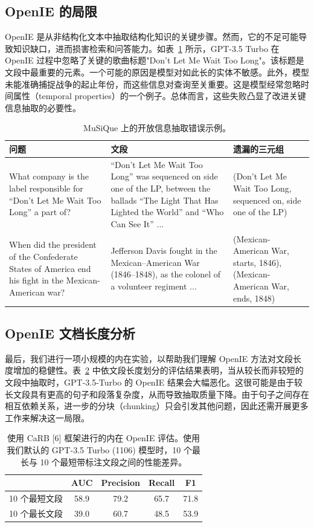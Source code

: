 \documentclass[11pt,UTF8,fontset=fandol]{ctexart}
\begin{document}
\subsection{OpenIE 的局限}

OpenIE 是从非结构化文本中抽取结构化知识的关键步骤。然而，它的不足可能导致知识缺口，进而损害检索和问答能力。如表~\ref{tab:15} 所示，GPT-3.5 Turbo 在 OpenIE 过程中忽略了关键的歌曲标题"Don't Let Me Wait Too Long"。该标题是文段中最重要的元素。一个可能的原因是模型对如此长的实体不敏感。此外，模型未能准确捕捉战争的起止年份，而这些信息对查询至关重要。这是模型经常忽略时间属性（temporal properties）的一个例子。总体而言，这些失败凸显了改进关键信息抽取的必要性。

\begin{table}[H]\centering
\caption{MuSiQue 上的开放信息抽取错误示例。}
\label{tab:15}
\footnotesize
\begin{tabular}{p{3.6cm}p{6.0cm}p{4.2cm}}
\toprule
问题 & 文段 & 遗漏的三元组 \\
\midrule
What company is the label responsible for ``Don't Let Me Wait Too Long'' a part of? &
``Don't Let Me Wait Too Long'' was sequenced on side one of the LP, between the ballads ``The Light That Has Lighted the World'' and ``Who Can See It'' ... &
(Don't Let Me Wait Too Long, sequenced on, side one of the LP) \\
\midrule
When did the president of the Confederate States of America end his fight in the Mexican-American war? &
Jefferson Davis fought in the Mexican--American War (1846--1848), as the colonel of a volunteer regiment ... &
(Mexican-American War, starts, 1846), (Mexican-American War, ends, 1848) \\
\bottomrule
\end{tabular}
\end{table}

\subsection{OpenIE 文档长度分析}

最后，我们进行一项小规模的内在实验，以帮助我们理解 OpenIE 方法对文段长度增加的稳健性。表~\ref{tab:16} 中依文段长度划分的评估结果表明，当从较长而非较短的文段中抽取时，GPT-3.5-Turbo 的 OpenIE 结果会大幅恶化。这很可能是由于较长文段具有更高的句子和段落复杂度，从而导致抽取质量下降。由于句子之间存在相互依赖关系，进一步的分块（chunking）只会引发其他问题，因此还需开展更多工作来解决这一局限。

\begin{table}[H]\centering
\caption{使用 CaRB [6] 框架进行的内在 OpenIE 评估。使用我们默认的 GPT-3.5 Turbo (1106) 模型时，10 个最长与 10 个最短带标注文段之间的性能差异。}
\label{tab:16}
\begin{tabular}{lcccc}
\toprule
 & AUC & Precision & Recall & F1 \\
\midrule
10 个最短文段 & 58.9 & 79.2 & 65.7 & 71.8 \\
10 个最长文段 & 39.0 & 60.7 & 48.5 & 53.9 \\
\bottomrule
\end{tabular}
\end{table}
\end{document}
